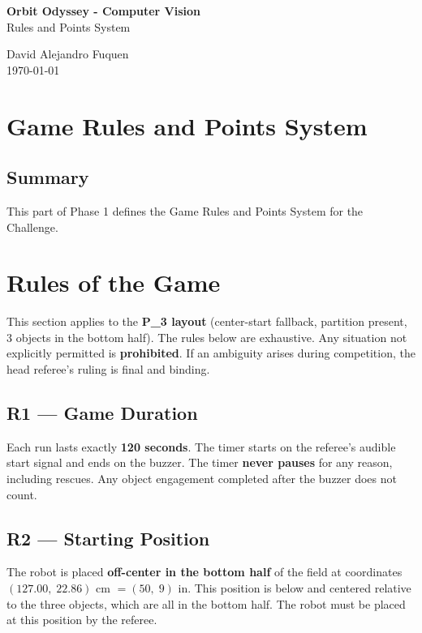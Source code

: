 \documentclass[a4]{article}
\begin{document}
\thispagestyle{fancy}

\begin{center}
    \textbf{\large Orbit Odyssey - Computer Vision} \\
    {Rules and Points System}
    
    \vspace{0.7em}

    David Alejandro Fuquen \\

    {\small \today}

\end{center}

\section*{Game Rules and Points System}

\subsection*{Summary}
This part of Phase 1 defines the Game Rules and Points System for the Challenge. 

\section*{Rules of the Game}
This section applies to the \textbf{P\_3 layout} (center-start fallback, partition present, 3 objects in the bottom half). The rules below are exhaustive. Any situation not explicitly permitted is \textbf{prohibited}. If an ambiguity arises during competition, the head referee's ruling is final and binding.

\subsection*{R1 --- Game Duration}
Each run lasts exactly \textbf{120 seconds}. The timer starts on the referee's audible start signal and ends on the buzzer. The timer \textbf{never pauses} for any reason, including rescues. Any object engagement completed after the buzzer does not count.

\subsection*{R2 --- Starting Position}
The robot is placed \textbf{off-center in the bottom half} of the field at coordinates $(127.00,\; 22.86)$ cm $= (50,\; 9)$ in. This position is below and centered relative to the three objects, which are all in the bottom half. The robot must be placed at this position by the referee.
\end{document}
